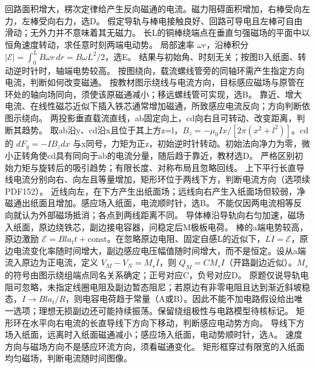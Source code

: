 \workings 回路面积增大，楞次定律给产生反向磁通的电流。磁力阻碍面积增加，右棒受向左力，左棒受向右力，选D。
\crosscheck 假定导轨与棒电接触良好、回路可导电且左棒可自由滑动；无外力并不意味着其无磁力。
\problemtext 长L的铜棒绕端点在垂直匀强磁场的平面中以恒角速度转动，求任意时刻两端电动势。
\workings 局部速率 $\omega r$，沿棒积分 $|\mathcal E|=\int_0^L B\omega r\,dr=B\omega L^2/2$，选E。
\crosscheck 结果与初始角、时刻无关；按图B入纸面、转动逆时针时，轴端电势较高。
\problemtext 按图绕向，载流螺线管旁的同轴环需产生指定方向电流，判断如何改变磁通。
\workings 按教材图示绕线与电流方向，目标感应磁场与原管在环处的轴向场同向，须使该原磁通减小；移远螺线管可实现，选B。
\crosscheck 靠近、增大电流、在线性磁芯近似下插入铁芯通常增加磁通，所致感应电流反向；方向判断依图示绕向。
\problemtext 两投影垂直载流直线，ab固定向上，cd向右且可转动、改变距离，判断其趋势。
\workings 取ab沿y、cd沿x且位于其上方z=l，$B_z=-\mu_0I x/[2\pi(x^2+l^2)]$。cd的 $dF_y=-I B_zdx$ 与x同号，力矩为正z，初始逆时针转动。初始法向净力为零，微小正转角使cd具有同向于ab的电流分量，随后趋于靠近，教材选D。
\crosscheck 严格区别初始力矩与旋转后的吸引趋势；有限长度、对称布局且忽略回线。
\problemtext 上下平行长直导线电流分别向右、向左且等量增加，矩形环位于两线下方，判断电流方向（选项续PDF152）。
\workings 近线向左，在下方产生出纸面场；远线向右产生入纸面场但较弱，净磁通出纸面且增加。感应场入纸面，电流顺时针，选B。
\crosscheck 不能仅因两电流相等反向就认为外部磁场抵消；各点到两线距离不同。
\problemtext 导体棒沿导轨向右匀加速，磁场入纸面，原边绕铁芯，副边接电容器，问稳定后M极板电荷。
\workings 棒的a端电势较高，原边激励 $\mathcal E=Bla_t t+\mathrm{const}$。在忽略原边电阻、固定自感L的近似下，$L\dot I=\mathcal E$，原边电流变化率随时间增大，副边感应电压幅值随时间增大，而不是恒定。设从a端流入原边为正电流，定义 $V_M-V_N=M_s\dot I$，则 $Q_M=C M_s\dot I$（开路副边近似）。$M_s$ 的符号由图示绕组端点同名关系确定；正号对应C，负号对应D。
\crosscheck 原题仅说导轨电阻可忽略，未指定线圈电阻及副边暂态阻尼；若原边有非零电阻且达到渐近斜坡稳态，$\dot I\to Bla_t/R$，则电容电荷趋于常量（A或B）。因此不能不加电路假设给出唯一选项；理想无损副边还可能持续振荡。保留绕组极性与电路模型待核标记。
\problemtext 矩形环在水平向右电流的长直导线下方向下移动，判断感应电动势方向。
\workings 导线下方场入纸面，远离时入纸面磁通减小；感应场入纸面，电动势顺时针，选A。
\crosscheck 速度方向与磁场方向不是感应环流方向，须看磁通变化。
\problemtext 矩形框穿过有限宽的入纸面均匀磁场，判断电流随时间图像。
